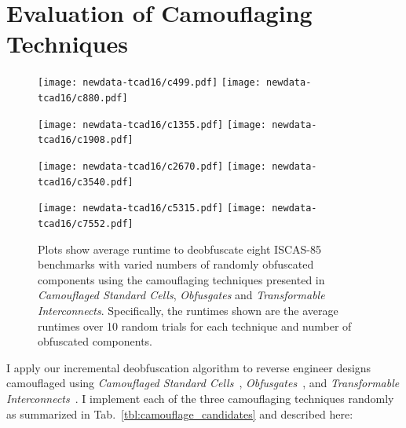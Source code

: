 \documentclass[proposal]{umassthesis}  %
\begin{document}
\section{Evaluation of Camouflaging Techniques}

\begin{figure}[!hbt]
  \centering
    \texttt{[image: newdata-tcad16/c499.pdf]} \hspace{.3cm}
    \texttt{[image: newdata-tcad16/c880.pdf]} 
    \vspace{-2mm}

    \texttt{[image: newdata-tcad16/c1355.pdf]} \hspace{.3cm}
    \texttt{[image: newdata-tcad16/c1908.pdf]} 
        \vspace{-2mm}

    \texttt{[image: newdata-tcad16/c2670.pdf]} \hspace{.3cm}
    \texttt{[image: newdata-tcad16/c3540.pdf]}
        \vspace{-2mm}

    \texttt{[image: newdata-tcad16/c5315.pdf]} \hspace{.3cm}
    \texttt{[image: newdata-tcad16/c7552.pdf]}

    \caption{Plots show average runtime to deobfuscate eight ISCAS-85 benchmarks with varied numbers of randomly obfuscated components using the camouflaging techniques presented in {\textit{Camouflaged Standard Cells}\cite{rajendran-13}, \textit{Obfusgates}\cite{malik-obfusgate} and \textit{Transformable Interconnects}\cite{chen-2015-dummyWire}}. Specifically, the runtimes shown are the average runtimes over 10 random trials for each technique and number of obfuscated components.}
    \label{fig:tcad16-comparison}
\end{figure}
I apply our incremental deobfuscation algorithm to reverse engineer designs camouflaged using \textit{Camouflaged Standard Cells}~\cite{rajendran-13}, \textit{Obfusgates}~\cite{malik-obfusgate}, and \textit{Transformable Interconnects}~\cite{chen-2015-dummyWire}. I implement each of the three camouflaging techniques randomly as summarized in Tab.~\ref{tbl:camouflage_candidates} and described here: 
\end{document}
